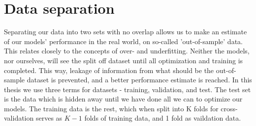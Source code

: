 \section{Data separation}
Separating our data into two sets with no overlap allows us to make an estimate of
our models' performance in the real world, on so-called 'out-of-sample' data.
This relates closely to the concepts of over- and underfitting. Neither the models,
nor ourselves, will see the split off dataset until all optimization and training
is completed. This way, leakage of information from what should be the out-of-sample
dataset is prevented, and a better performance estimate is reached. In this thesis we
use three terms for datasets - training, validation, and test. The test set is the data
which is hidden away until we have done all we can to optimize our models.
The training data is the rest, which when split into K folds for cross-validation
serves as $K-1$ folds of training data, and 1 fold as vaildation data.